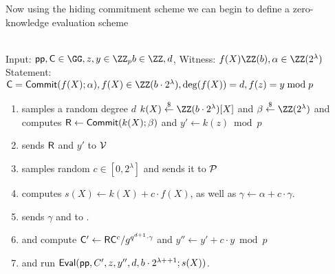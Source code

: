 Now using the hiding commitment scheme we can begin to define a zero-knowledge evaluation scheme
 \noindent\begin{mdframed}[userdefinedwidth=\textwidth]
\begin{minipage}{\textwidth}
	\begin{flushleft}
	\\
	Input: $\crs,\gr{C} \in \GG,z,y \in \ZZ_p b\in \ZZ,d$, Witness: $f(X) \ZZ(b),\alpha \in \ZZ(2^\lambda)$\\
	Statement: $\gr{C}=\commit(f(X);\alpha),f(X) \in \ZZ(b\cdot 2^\lambda),\deg(f(X))=d, f(z)=y \bmod p$
	\begin{enumerate}[nolistsep]
		    \item \prover samples a random degree $d$ $k(X) \sample \ZZ(b\cdot 2^\lambda)[X]$ and $\beta \sample \ZZ(2^\lambda)$ and computes $\mathsf{R}\gets \textsf{{Commit}}(k(X);\beta)$ and $y'\gets k(z) \bmod p$
		    \item \prover sends $\mathsf{R}$ and $y'$ to $\mathcal{V}$
		    \item \verifier samples random $c\in [0,2^\lambda]$ and sends it to $\mathcal{P}$
		    \item \prover computes $s(X)\gets k(X) + c \cdot f(X)$, as well as $\gamma\gets \alpha+ c\cdot \gamma$. 
		    \item \prover sends $\gamma$ and to \verifier.
		    \item \prover and \verifier compute $\mathsf{C}'\gets \mathsf{R}\mathsf{C}^c/g^{q^{d+1}\cdot \gamma}$ and $y''\gets y'+c \cdot y \bmod p$
		    \item \prover and \verifier run $\textsf{{Eval}}(\textsf{pp},C',z,y'',d,b\cdot 2^{\lambda++1};s(X))$.
		   		\end{enumerate}
	\end{flushleft}
\end{minipage}
\end{mdframed}

